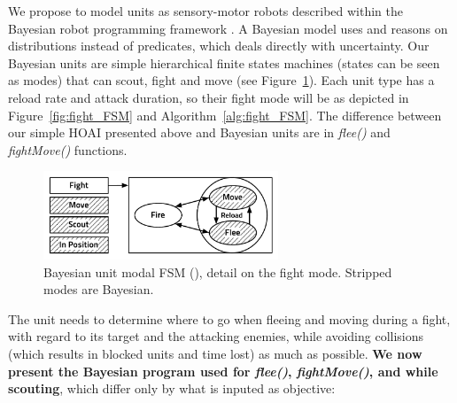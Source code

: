 We propose to model units as sensory-motor robots described within the Bayesian robot programming framework \citep{Lebeltel04}. A Bayesian model uses and reasons on distributions instead of predicates, which deals directly with uncertainty. %
Our Bayesian units are simple hierarchical finite states machines (states can be seen as modes) that can scout, fight and move (see Figure~\ref{fig:unit_HFSM}). Each unit type has a reload rate and attack duration, so their fight mode will be as depicted in Figure~\ref{fig:fight_FSM} and Algorithm~\ref{alg:fight_FSM}. The difference between our simple HOAI presented above and Bayesian units are in \textit{flee()} and \textit{fightMove()} functions.
\begin{figure}[h]
\begin{center}
\includegraphics[width=7cm]{images/unit_HFSM2.pdf}
\end{center}
\caption{Bayesian unit modal FSM (), detail on the fight mode. Stripped modes are Bayesian.}
\label{fig:unit_HFSM}
\end{figure}

The unit needs to determine where to go when fleeing and moving during a fight, with regard to its target and the attacking enemies, while avoiding collisions (which results in blocked units and time lost) as much as possible. \textbf{We now present the Bayesian program used for \textit{flee()}, \textit{fightMove()}, and while scouting}, which differ only by what is inputed as objective:
